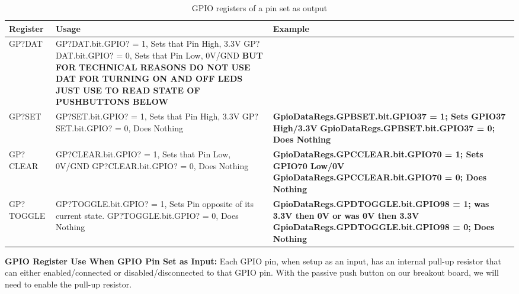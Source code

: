 \documentclass[11pt]{article}
\begin{document}
\begin{table}[H]
    \centering
    \footnotesize
    \renewcommand{\arraystretch}{1.2}
    \begin{tabular}{|>{\centering\arraybackslash}p{}|>{\centering\arraybackslash}p{}|>{\centering\arraybackslash}p{}|}
        \hline
        \textbf{Register} & \textbf{Usage} & \textbf{Example} \\ \hline
        GP?DAT &
        GP?DAT.bit.GPIO? = 1, Sets that Pin High, 3.3V \newline
        GP?DAT.bit.GPIO? = 0, Sets that Pin Low, 0V/GND \newline
        \textbf{BUT FOR TECHNICAL REASONS DO NOT USE DAT FOR TURNING ON AND OFF LEDS JUST USE TO READ STATE OF PUSHBUTTONS BELOW} & \\ \hline
        GP?SET &
        GP?SET.bit.GPIO? = 1, Sets that Pin High, 3.3V \newline
        GP?SET.bit.GPIO? = 0, Does Nothing &
        \textbf{GpioDataRegs.GPBSET.bit.GPIO37 = 1; Sets GPIO37 High/3.3V} \newline
        \textbf{GpioDataRegs.GPBSET.bit.GPIO37 = 0; Does Nothing} \\ \hline
        GP?CLEAR &
        GP?CLEAR.bit.GPIO? = 1, Sets that Pin Low, 0V/GND \newline
        GP?CLEAR.bit.GPIO? = 0, Does Nothing &
        \textbf{GpioDataRegs.GPCCLEAR.bit.GPIO70 = 1; Sets GPIO70 Low/0V} \newline
        \textbf{GpioDataRegs.GPCCLEAR.bit.GPIO70 = 0; Does Nothing} \\ \hline
        GP?TOGGLE &
        GP?TOGGLE.bit.GPIO? = 1, Sets Pin opposite of its current state. \newline
        GP?TOGGLE.bit.GPIO? = 0, Does Nothing &
        \textbf{GpioDataRegs.GPDTOGGLE.bit.GPIO98 = 1; was 3.3V then 0V or was 0V then 3.3V} \newline
        \textbf{GpioDataRegs.GPDTOGGLE.bit.GPIO98 = 0; Does Nothing} \\ \hline
    \end{tabular}
    \caption{GPIO registers of a pin set as output}
\end{table}
%
\textbf{GPIO Register Use When GPIO Pin Set as Input:} Each GPIO pin, when setup as an input, has an internal pull-up resistor that can either enabled/connected or disabled/disconnected to that GPIO pin. With the passive push button on our breakout board, we will need to enable the pull-up resistor.
\end{document}
